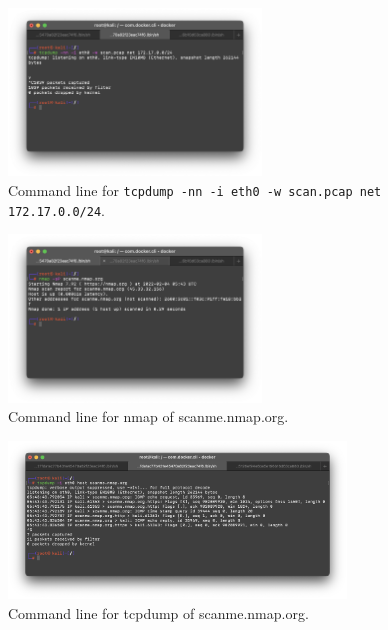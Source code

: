 \documentclass[12pt]{article}
\begin{document}
\begin{figure}[!ht]
    \centering
    \includegraphics[width=0.6\textwidth]{figure06.png}\vspace{-1em}
    \caption{Command line for \texttt{tcpdump -nn -i eth0 -w scan.pcap net 172.17.0.0/24}.}
    \label{fig:nmap02}
\end{figure}

\begin{figure}[!ht]
    \centering
    \includegraphics[width=0.6\textwidth]{figure07.png}\vspace{-1em}
    \caption{Command line for nmap of scanme.nmap.org.}
    \label{fig:nmap03}
\end{figure}

\begin{figure}[!ht]
    \centering
    \includegraphics[width=0.8\textwidth]{figure08.png}\vspace{-1em}
    \caption{Command line for tcpdump of scanme.nmap.org.}
    \label{fig:nmap04}
\end{figure}
\end{document}
